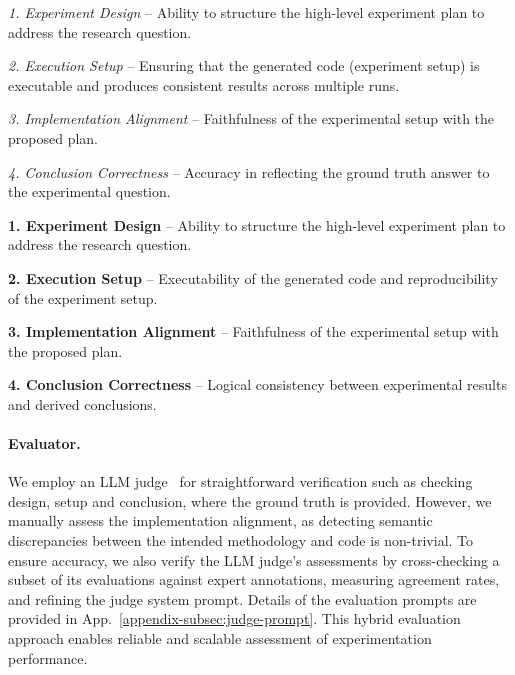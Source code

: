 \noindent\textit{1. Experiment Design} – Ability to structure the high-level experiment plan to address the research question. 

\noindent\textit{2. Execution Setup} – Ensuring that the generated code (experiment setup) is executable and produces consistent results across multiple runs.

\noindent\textit{3. Implementation Alignment} – Faithfulness of the experimental setup with the proposed plan.

\noindent\textit{4. Conclusion Correctness} – Accuracy in reflecting the ground truth answer to the experimental question.

\noindent\textbf{1. Experiment Design} – Ability to structure the high-level experiment plan to address the research question. 

\noindent\textbf{2. Execution Setup} – Executability of the generated code and reproducibility of the experiment setup.

\noindent\textbf{3. Implementation Alignment} – Faithfulness of the experimental setup with the proposed plan.

\noindent\textbf{4. Conclusion Correctness} – Logical consistency between experimental results and derived conclusions.
\fi



\paragraph{Evaluator.} 
We employ an LLM judge~\cite{zheng2023judging} for straightforward verification such as checking design, setup and conclusion, where the ground truth is provided.
However, we manually assess the implementation alignment, as detecting semantic discrepancies between the intended methodology and code is non-trivial. 
To ensure accuracy, we also verify the LLM judge’s assessments by cross-checking a subset of its evaluations against expert annotations, measuring agreement rates, and refining the judge system prompt. Details of the evaluation prompts are provided in App.~\ref{appendix-subsec:judge-prompt}.
This hybrid evaluation approach enables reliable and scalable assessment of experimentation performance.




